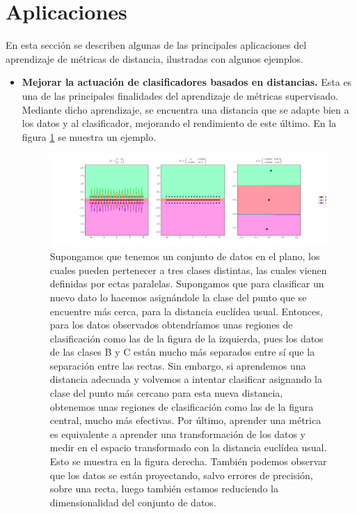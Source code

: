 \documentclass{book}
\begin{document}
\section{Aplicaciones} \label{section:aplicaciones}

En esta sección se describen algunas de las principales aplicaciones del aprendizaje de métricas de distancia, ilustradas con algunos ejemplos.


\begin{itemize}
	\item \textbf{Mejorar la actuación de clasificadores basados en distancias.} Esta es una de las principales finalidades del aprendizaje de métricas supervisado. Mediante dicho aprendizaje, se encuentra una distancia que se adapte bien a los datos y al clasificador, mejorando el rendimiento de este último. En la figura \ref{fig:mejorar_knn} se muestra un ejemplo.

	\begin{figure}[h]
	\centering
	\includegraphics[width=21cm,center]{./images/ex_learning_nca.png}
	\caption{Supongamos que tenemos un conjunto de datos en el plano, los cuales pueden pertenecer a tres clases distintas, las cuales vienen definidas por ectas paralelas. Supongamos que para clasificar un nuevo dato lo hacemos asignándole la clase del punto que se encuentre más cerca, para la distancia euclídea usual. Entonces, para los datos observados obtendríamos unas regiones de clasificación como las de la figura de la izquierda, pues los datos de las clases B y C están mucho más separados entre sí que la separación entre las rectas. Sin embargo, si aprendemos una distancia adecuada y volvemos a intentar clasificar asignando la clase del punto más cercano para esta nueva distancia, obtenemos unas regiones de clasificación como las de la figura central, mucho más efectivas. Por último, aprender una métrica es equivalente a aprender una transformación de los datos y medir en el espacio transformado con la distancia euclídea usual. Esto se muestra en la figura derecha. También podemos observar que los datos se están proyectando, salvo errores de precisión, sobre una recta, luego también estamos reduciendo la dimensionalidad del conjunto de datos.} \label{fig:mejorar_knn}
	\end{figure}
	

\end{itemize}
\end{document}
